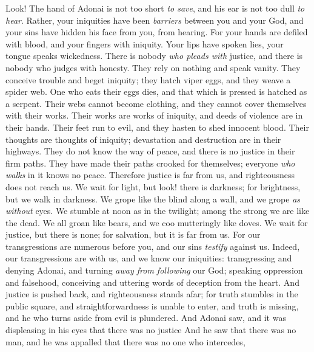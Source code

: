 \begin{biblechapter} %
 Look! The hand of Adonai is not too short \textit{to save}, 
and his ear is not too dull \textit{to hear}.
\verse Rather, your iniquities have been \textit{barriers} between you and your God, 
and your sins have hidden his face from you, from hearing.
\verse For your hands are defiled with blood, 
and your fingers with iniquity. 
Your lips have spoken lies, 
your tongue speaks wickedness.
\verse There is nobody \textit{who pleads with} justice, 
and there is nobody who judges with honesty. 
They rely on nothing 
and speak vanity. 
They conceive trouble 
and beget iniquity;
\verse they hatch viper eggs, 
and they weave a spider web. 
One who eats their eggs dies, 
and that which is pressed is hatched as a serpent.
\verse Their webs cannot become clothing, 
and they cannot cover themselves with their works. 
Their works are works of iniquity, 
and deeds of violence are in their hands.
\verse Their feet run to evil, 
and they hasten to shed innocent blood. 
Their thoughts are thoughts of iniquity; 
devastation and destruction are in their highways.
\verse They do not know the way of peace, 
and there is no justice in their firm paths. 
They have made their paths crooked for themselves; 
everyone \textit{who walks} in it knows no peace.
\verse Therefore justice is far from us, 
and righteousness does not reach us. 
We wait for light, but look! there is darkness; 
for brightness, but we walk in darkness.
\verse We grope like the blind along a wall, 
and we grope \textit{as without} eyes. 
We stumble at noon as in the twilight; 
among the strong we are like the dead.
\verse We all groan like bears, 
and we coo mutteringly like doves. 
We wait for justice, but there is none; 
for salvation, but it is far from us.
\verse For our transgressions are numerous before you, 
and our sins \textit{testify} against us. 
Indeed, our transgressions are with us, 
and we know our iniquities:
\verse transgressing and denying Adonai, 
and turning \textit{away from following} our God; 
speaking oppression and falsehood, 
conceiving and uttering words of deception from the heart.
\verse And justice is pushed back, 
and righteousness stands afar; 
for truth stumbles in the public square, 
and straightforwardness is unable to enter,
\verse and truth is missing, 
and he who turns aside from evil is plundered. 
And Adonai saw, 
and it was displeasing in his eyes that there was no justice
\verse And he saw that there was no man, 
and he was appalled that there was no one who intercedes, 

\end{biblechapter}
